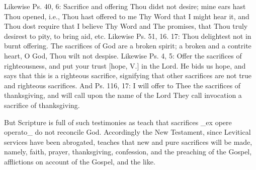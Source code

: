 Likewise Ps. 40, 6: Sacrifice and offering Thou didst not desire;
mine ears hast Thou opened, i.e., Thou hast offered to me Thy Word
that I might hear it, and Thou dost require that I believe Thy Word
and The promises, that Thou truly desirest to pity, to bring aid, etc.
Likewise Ps. 51, 16. 17: Thou delightest not in burnt offering.  The
sacrifices of God are a broken spirit; a broken and a contrite heart,
O God, Thou wilt not despise.  Likewise Ps. 4, 5: Offer the
sacrifices of righteousness, and put your trust [hope, V.] in the
Lord.  He bids us hope, and says that this is a righteous sacrifice,
signifying that other sacrifices are not true and righteous
sacrifices.  And Ps. 116, 17: I will offer to Thee the sacrifices of
thanksgiving, and will call upon the name of the Lord They call
invocation a sacrifice of thanksgiving.

But Scripture is full of such testimonies as teach that sacrifices
_ex opere operato_ do not reconcile God.  Accordingly the New
Testament, since Levitical services have been abrogated, teaches that
new and pure sacrifices will be made, namely, faith, prayer,
thanksgiving, confession, and the preaching of the Gospel,
afflictions on account of the Gospel, and the like.

